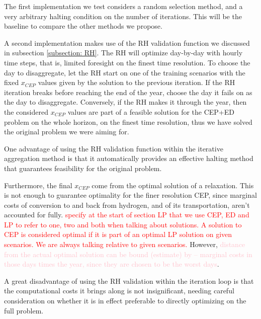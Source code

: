 The first implementation we test considers a random selection method, and a very arbitrary halting condition on the number of iterations. 
This will be the baseline to compare the other methods we propose.

A second implementation makes use of the RH validation function we discussed in subsection \ref{subsection: RH}. 
The RH will optimize day-by-day with hourly time steps, that is, limited foresight on the finest time resolution. 
To choose the day to disaggregate, let the RH start on one of the training scenarios with the fixed $x_{CEP}$ values given by the solution to the previous iteration. 
If the RH iteration breaks before reaching the end of the year, choose the day it fails on as the day to disaggregate. 
Conversely, if the RH makes it through the year, then the considered $x_{CEP}$ values are part of a feasible solution for the CEP+ED problem on the whole horizon, on the finest time resolution, thus we have solved the original problem we were aiming for.

One advantage of using the RH validation function within the iterative aggregation method is that it automatically provides an effective halting method that guarantees feasibility for the original problem.

Furthermore, the final $x_{CEP}$ come from the optimal solution of a relaxation. 
This is not enough to guarantee optimality for the finer resolution CEP, since marginal costs of conversion to and back from hydrogen, and of its transportation, aren't accounted for fully. 
\textcolor{red}{specify at the start of section LP that we use CEP, ED and LP to refer to one, two and both when talking about solutions. A solution to CEP is considered optimal if it is part of an optimal LP solution on given scenarios. We are always talking relative to given scenarios.}
However, \textcolor{pink}{distance from the actual optimal solution can be bound (estimate) by -- marginal costs in those days times the year, since they are chosen to be the worst days}.

A great disadvantage of using the RH validation within the iteration loop is that the computational costs it brings along is not insignificant, needing careful consideration on whether it is in effect preferable to directly optimizing on the full problem.



